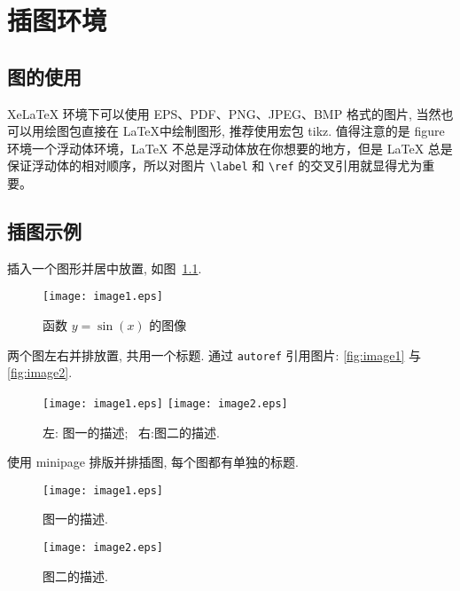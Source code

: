 \documentclass[master,print]{shnuthesis}
\begin{document}

\chapter{插图环境}

\section{图的使用}

XeLaTeX 环境下可以使用 EPS、PDF、PNG、JPEG、BMP 格式的图片, 当然也可以用绘图包直接在 \LaTeX 中绘制图形, 推荐使用宏包 tikz. 值得注意的是 figure 环境一个浮动体环境，LaTeX 不总是浮动体放在你想要的地方，但是 LaTeX 总是保证浮动体的相对顺序，所以对图片 \verb|\label| 和 \verb|\ref| 的交叉引用就显得尤为重要。

\section{插图示例}

插入一个图形并居中放置, 如图~\ref{fig:sinx}.
\begin{figure}[htp!]
  \centering
  \texttt{[image: image1.eps]}
  \caption{函数 $y=\sin(x)$ 的图像}\label{fig:sinx}
\end{figure}

两个图左右并排放置, 共用一个标题. 通过 \verb|autoref| 引用图片: \autoref{fig:image1} 与 \autoref{fig:image2}.
\begin{figure}[htp!]
\centering
  \texttt{[image: image1.eps]}
  \hfill
  \texttt{[image: image2.eps]}
  \caption{左: 图一的描述;~ 右:图二的描述.}
  \label{fig:image}
\end{figure}

\clearpage
使用 minipage 排版并排插图, 每个图都有单独的标题.
\begin{figure}[htp!]
\begin{minipage}[t]{0.48\linewidth}
\centering
  \texttt{[image: image1.eps]}
    \caption{图一的描述.}
    \label{fig:image1}
\end{minipage}
  \hfill
\begin{minipage}[t]{0.48\linewidth}
\centering
   \texttt{[image: image2.eps]}
   \caption{图二的描述.}
   \label{fig:image2}
\end{minipage}
\end{figure}
\end{document}

